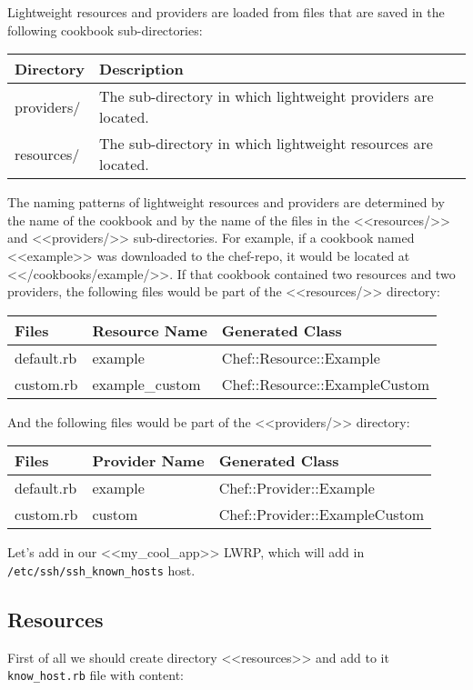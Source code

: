 Lightweight resources and providers are loaded from files that are saved in the following cookbook sub-directories:

\begin{tabular}{ | l | l | }
  \hline
  Directory	& Description \\
  \hline
  providers/ & The sub-directory in which lightweight providers are located. \\
  resources/ & The sub-directory in which lightweight resources are located. \\
  \hline
\end{tabular}

The naming patterns of lightweight resources and providers are determined by the name of the cookbook and by the name of the files in the <<resources/>> and <<providers/>> sub-directories. For example, if a cookbook named <<example>> was downloaded to the chef-repo, it would be located at <</cookbooks/example/>>. If that cookbook contained two resources and two providers, the following files would be part of the <<resources/>> directory:

\begin{tabular}{ | l | l | l | }
  \hline
  Files	& Resource Name	& Generated Class \\
  \hline
  default.rb & example & Chef::Resource::Example \\
  custom.rb	& example\_custom & Chef::Resource::ExampleCustom \\
  \hline
\end{tabular}

And the following files would be part of the <<providers/>> directory:

\begin{tabular}{ | l | l | l | }
  \hline
  Files	& Provider Name	& Generated Class \\
  \hline
  default.rb & example & Chef::Provider::Example \\
  custom.rb	& custom & Chef::Provider::ExampleCustom \\
  \hline
\end{tabular}

Let's add in our <<my\_cool\_app>> LWRP, which will add in \lstinline!/etc/ssh/ssh_known_hosts! host.

\subsection{Resources}

First of all we should create directory <<resources>> and add to it \lstinline!know_host.rb! file with content:

